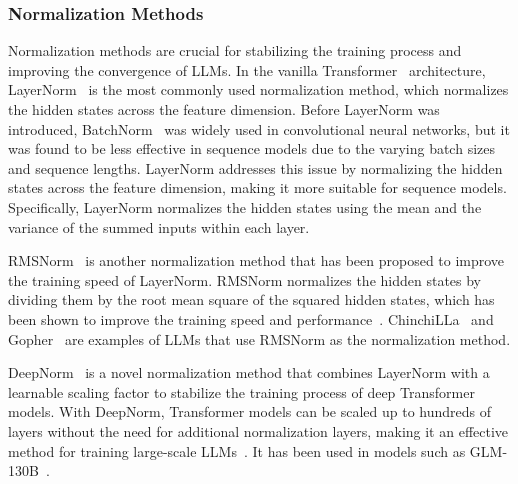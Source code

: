 \subsubsection{Normalization Methods}
\label{subsubsec:normalization}
Normalization methods are crucial for stabilizing the training process and improving the convergence of LLMs.
In the vanilla Transformer~\cite{vaswani2023attention} architecture, LayerNorm~\cite{ba2016layer} is the most commonly used normalization method, which normalizes the hidden states across the feature dimension.
Before LayerNorm was introduced, BatchNorm~\cite{ioffe2015batch} was widely used in convolutional neural networks, but it was found to be less effective in sequence models due to the varying batch sizes and sequence lengths.
LayerNorm addresses this issue by normalizing the hidden states across the feature dimension, making it more suitable for sequence models.
Specifically, LayerNorm normalizes the hidden states using the mean and the variance of the summed inputs within each layer.

RMSNorm~\cite{zhang2019root} is another normalization method that has been proposed to improve the training speed of LayerNorm.
RMSNorm normalizes the hidden states by dividing them by the root mean square of the squared hidden states, which has been shown to improve the training speed and performance~\cite{narang2021transformer}.
ChinchiLLa~\cite{hoffmann2022training} and Gopher~\cite{rae2021scaling} are examples of LLMs that use RMSNorm as the normalization method.

DeepNorm~\cite{wang2022deepnet} is a novel normalization method that combines LayerNorm with a learnable scaling factor to stabilize the training process of deep Transformer models.
With DeepNorm, Transformer models can be scaled up to hundreds of layers without the need for additional normalization layers, making it an effective method for training large-scale LLMs~\cite{wang2022deepnet}.
It has been used in models such as GLM-130B~\cite{zeng2022glm130b}.

